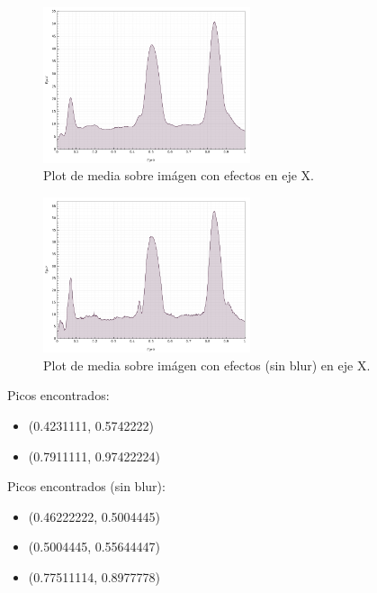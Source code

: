 \begin{figure}[H]
	\vspace{-0.2cm}
	\centering
	\includegraphics[width=230px]{imagenes-jtlc/experimento/search-peaks/2/plot-x}
	\centering
	\caption{Plot de media sobre im\'agen con efectos en eje X.}
	\label{fig:sp-2-plot-x}
	\vspace{-0.15cm}
\end{figure}
\begin{figure}[H]
	\vspace{-0.2cm}
	\centering
	\includegraphics[width=230px]{imagenes-jtlc/experimento/search-peaks/2/plot-x-no-blur}
	\centering
	\vspace{-0.4cm}
	\caption{Plot de media sobre im\'agen con efectos (sin blur) en eje X.}
	\label{fig:sp-2-plot-x-no-blur}
	\vspace{-0.15cm}
\end{figure}

Picos encontrados:
\begin{itemize}
	\addtolength{\itemindent}{1cm}
	\item (0.4231111, 0.5742222)
	\item (0.7911111, 0.97422224)
\end{itemize}

Picos encontrados (sin blur):
\begin{itemize}
	\addtolength{\itemindent}{1cm}
	\item (0.46222222, 0.5004445)
	\item (0.5004445, 0.55644447)
	\item (0.77511114, 0.8977778)
\end{itemize}

